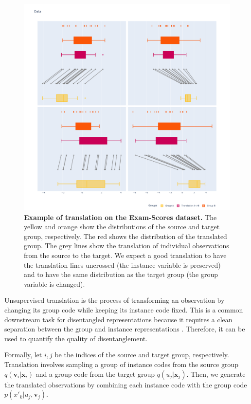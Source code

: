 \documentclass[nohyperref]{article}
\theoremstyle{plain}
\theoremstyle{definition}
\theoremstyle{remark}
\begin{document}
\begin{figure}[ht]
    \vskip 0.2in
    \begin{center}
    \centerline{\includegraphics[width=\columnwidth]{files/data_trans.pdf}}
    \caption{\textbf{Example of translation on the Exam-Scores dataset.} The yellow and orange show the distributions of the source and target group, respectively. The red shows the distribution of the translated group. The grey lines show the translation of individual observations from the source to the target. We expect a good translation to have the translation lines uncrossed (the instance variable is preserved) and to have the same distribution as the target group (the group variable is changed).}
    \label{trans}
    \end{center}
    \vskip -0.2in
\end{figure}

Unsupervised translation is the process of transforming an observation by changing its group code while keeping its instance code fixed. This is a common downstream task for disentangled representations because it requires a clean separation between the group and instance representations \citep{Tenenbaum2000SeparatingSA}. Therefore, it can be used to quantify the quality of disentanglement.

Formally, let $i, j$ be the indices of the source and target group, respectively. Translation involves sampling a group of instance codes from the source group $q(\mathbf{v}_i | \mathbf{x}_i)$ and a group code from the target group $q(u_j | \mathbf{x}_j)$. Then, we generate the translated observations by combining each instance code with the group code $p(x'_{k} | u_j, \mathbf{v}_j)$.
\end{document}
